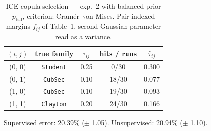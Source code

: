 \begin{table}[htbp]
  \centering
  \caption{ICE copula selection — exp.\ 2 with balanced prior $p_{\text{bal}}$, criterion: Cram\'er--von Mises. Pair-indexed margins $f_{ij}$ of Table~1, second Gaussian parameter read as a variance.}
  \label{tab:exp3-exp2_bal_p__cvm}
  \begin{tabular}{ccccc}
    \toprule
    $(i, j)$ & true family & $\tau_{ij}$ & hits / runs & $\hat\tau_{ij}$ \\
    \midrule
    (0, 0) & \texttt{Student} & 0.25 & 0/30 & 0.300 \\
    (0, 1) & \texttt{CubSec} & 0.10 & 18/30 & 0.077 \\
    (1, 0) & \texttt{CubSec} & 0.10 & 19/30 & 0.093 \\
    (1, 1) & \texttt{Clayton} & 0.20 & 24/30 & 0.166 \\
    \bottomrule
  \end{tabular}
  \par\smallskip Supervised error: 20.39\% ($\pm$ 1.05). Unsupervised: 20.94\% ($\pm$ 1.10).
\end{table}
